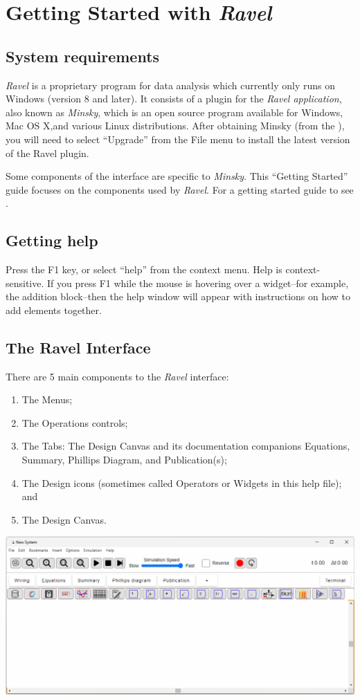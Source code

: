 
\chapter{Getting Started with \emph{Ravel}}

\section{System requirements}

\emph{Ravel} is a proprietary program for data analysis which
currently only runs on Windows (version 8 and later). It consists of a
plugin for the \emph{Ravel application}, also known as \emph{Minsky},
which is an open source program available for Windows, Mac OS X,and
various Linux distributions. After obtaining Minsky (from the
),
  you will need to select ``Upgrade'' from the File menu to install
  the latest version of the Ravel plugin.

Some components of the interface are specific to \emph{Minsky}. This
``Getting Started'' guide focuses on the components used by
\emph{Ravel}. For a getting started guide to see .

\section{Getting help}

Press the F1 key, or select ``help'' from the context menu. Help
is context-sensitive. If you press F1 while the mouse is hovering
over a widget--for example, the addition block--then the help window
will appear with instructions on how to add elements together.

\section{The Ravel Interface}

There are 5 main components to the \emph{Ravel} interface:
\begin{enumerate}
\item The Menus;
\item The Operations controls;
\item The Tabs: The Design Canvas and its documentation companions Equations,
Summary, Phillips Diagram, and Publication(s);
\item The Design icons (sometimes called Operators or Widgets in this help
file); and
\item The Design Canvas.
\end{enumerate}
\includegraphics[width=15cm]{images/Interface}

